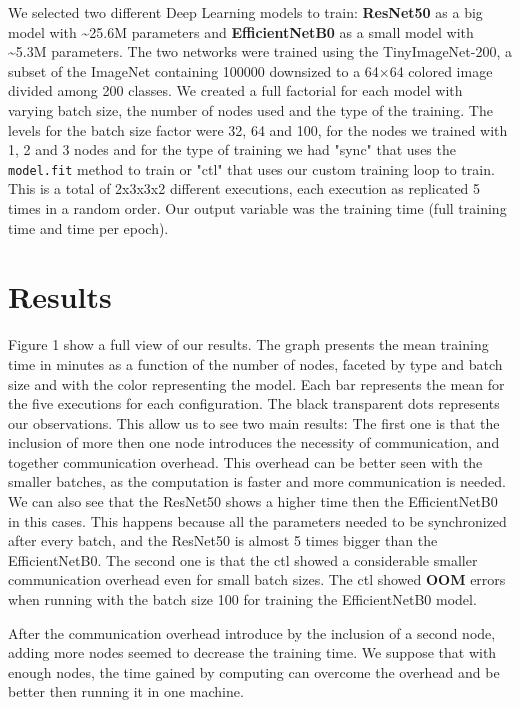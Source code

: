 \documentclass[12pt]{article}
\begin{document}
We selected two different Deep Learning models to train: \textbf{ResNet50}
\cite{resnet} as a big model with \textasciitilde{}25.6M parameters and
\textbf{EfficientNetB0}\cite{efficientNet} as a small model with \textasciitilde{}5.3M
parameters. The two networks were trained using the TinyImageNet-200,
a subset of the ImageNet\cite{imagenet} containing 100000 downsized to
a 64×64 colored image divided among 200 classes. We created a full
factorial for each model with varying batch size, the number of nodes
used and the type of the training. The levels for the batch size
factor were 32, 64 and 100, for the nodes we trained with 1, 2 and 3
nodes and for the type of training we had "sync" that uses the
\texttt{model.fit} method to train or "ctl" that uses our custom training loop
to train. This is a total of 2x3x3x2 different executions, each
execution as replicated 5 times in a random order. Our output variable
was the training time (full training time and time per epoch).


\section{Results}
\label{sec:org2a1502f}

Figure 1 show a full view of our results. The graph presents the mean
training time in minutes as a function of the number of nodes, faceted
by type and batch size and with the color representing the model. Each
bar represents the mean for the five executions for each
configuration. The black transparent dots represents our
observations. This allow us to see two main results: The first one is
that the inclusion of more then one node introduces the necessity of
communication, and together communication overhead. This overhead can
be better seen with the smaller batches, as the computation is faster
and more communication is needed. We can also see that the ResNet50
shows a higher time then the EfficientNetB0 in this cases. This
happens because all the parameters needed to be synchronized after
every batch, and the ResNet50 is almost 5 times bigger than the
EfficientNetB0. The second one is that the ctl showed a considerable
smaller communication overhead even for small batch sizes. The ctl
showed \textbf{OOM} errors when running with the batch size 100 for training
the EfficientNetB0 model.

After the communication overhead introduce by the inclusion of a
second node, adding more nodes seemed to decrease the training
time. We suppose that with enough nodes, the time gained by computing
can overcome the overhead and be better then running it in one machine.
\end{document}

